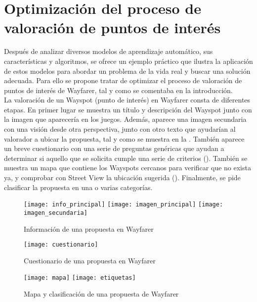 \chapter{Optimización del proceso de valoración de puntos de interés}\label{chapter:practica}

	Después de analizar diversos modelos de aprendizaje automático, sus características y algoritmos, se ofrece un ejemplo práctico que ilustra la aplicación de estos modelos para abordar un problema de la vida real y buscar una solución adecuada. Para ello se propone tratar de optimizar el proceso de valoración de puntos de interés de Wayfarer, tal y como se comentaba en la introducción. \\
	
	La valoración de un Wayspot (punto de interés) en Wayfarer consta de diferentes etapas. En primer lugar se muestra un título y descripción del Wayspot junto con la imagen que aparecería en los juegos. Además, aparece una imagen secundaria con una visión desde otra perspectiva, junto con otro texto que ayudarían al valorador a ubicar la propuesta, tal y como se muestra en la . También aparece un breve cuestionario con una serie de preguntas genéricas que ayudan a determinar si aquello que se solicita cumple una serie de criterios (). También se muestra un mapa que contiene los Wayspots cercanos para verificar que no exista ya, y comprobar con Street View la ubicación sugerida (). Finalmente, se pide clasificar la propuesta en una o varias categorías. 
	
	\begin{figure}[!h]
		\centering
		\texttt{[image: info\_principal]}\hfill
		\texttt{[image: imagen\_principal]}\hfill
		\texttt{[image: imagen\_secundaria]}
		\caption{Información de una propuesta en Wayfarer}
		\label{fig:info_propuesta}
	\end{figure}
	
	\begin{figure}[!h]
		\centering
		\texttt{[image: cuestionario]}
		\caption{Cuestionario de una propuesta en Wayfarer}
		\label{fig:preguntas}
	\end{figure}
	
	\begin{figure}[!h]
		\centering
		\texttt{[image: mapa]}\hfill
		\texttt{[image: etiquetas]}
		\caption{Mapa y clasificación de una propuesta de Wayfarer}
		\label{fig:mapa}
	\end{figure}
	
